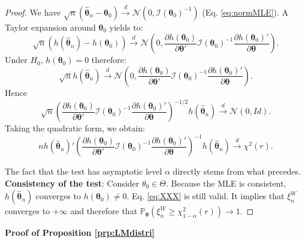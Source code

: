 \documentclass[
  12pt,
]{book}
\theoremstyle{definition}
\theoremstyle{definition}
\theoremstyle{definition}
\theoremstyle{definition}
\theoremstyle{remark}
\begin{document}
\begin{proof}
We have \(\sqrt{n}(\hat{\boldsymbol\theta}_{n} - \boldsymbol\theta_{0}) \overset{d}{\rightarrow} \mathcal{N}(0,\mathcal{I}(\boldsymbol\theta_0)^{-1})\) (Eq. \eqref{eq:normMLE}). A Taylor expansion around \(\boldsymbol\theta_0\) yields to:
\begin{equation}
\sqrt{n}(h(\hat{\boldsymbol\theta}_{n}) - h(\boldsymbol\theta_{0})) \overset{d}{\rightarrow} \mathcal{N}\left(0,\frac{\partial h(\boldsymbol\theta_{0})}{\partial \boldsymbol\theta'}\mathcal{I}(\boldsymbol\theta_0)^{-1}\frac{\partial h(\boldsymbol\theta_{0})'}{\partial \boldsymbol\theta}\right). \label{eq:XXX}
\end{equation}
Under \(H_0\), \(h(\boldsymbol\theta_{0})=0\) therefore:
\begin{equation}
\sqrt{n} h(\hat{\boldsymbol\theta}_{n}) \overset{d}{\rightarrow} \mathcal{N}\left(0,\frac{\partial h(\boldsymbol\theta_{0})}{\partial \boldsymbol\theta'}\mathcal{I}(\boldsymbol\theta_0)^{-1}\frac{\partial h(\boldsymbol\theta_{0})'}{\partial \boldsymbol\theta}\right). \label{eq:lm10}
\end{equation}
Hence
\[
\sqrt{n} \left(
\frac{\partial h(\boldsymbol\theta_{0})}{\partial \boldsymbol\theta'}\mathcal{I}(\boldsymbol\theta_0)^{-1}\frac{\partial h(\boldsymbol\theta_{0})'}{\partial \boldsymbol\theta}
\right)^{-1/2} h(\hat{\boldsymbol\theta}_{n}) \overset{d}{\rightarrow} \mathcal{N}\left(0,Id\right).
\]
Taking the quadratic form, we obtain:
\[
n h(\hat{\boldsymbol\theta}_{n})'  \left(
\frac{\partial h(\boldsymbol\theta_{0})}{\partial \boldsymbol\theta'}\mathcal{I}(\boldsymbol\theta_0)^{-1}\frac{\partial h(\boldsymbol\theta_{0})'}{\partial \boldsymbol\theta}
\right)^{-1} h(\hat{\boldsymbol\theta}_{n}) \overset{d}{\rightarrow} \chi^2(r).
\]

The fact that the test has asymptotic level \(\alpha\) directly stems from what precedes. \textbf{Consistency of the test}: Consider \(\theta_0 \in \Theta\). Because the MLE is consistent, \(h(\hat{\boldsymbol\theta}_{n})\) converges to \(h(\boldsymbol\theta_0) \ne 0\). Eq. \eqref{eq:XXX} is still valid. It implies that \(\xi^W_n\) converges to \(+\infty\) and therefore that \(\mathbb{P}_{\boldsymbol\theta}(\xi^W_n \ge \chi^2_{1-\alpha}(r)) \rightarrow 1\).
\end{proof}

\textbf{Proof of Proposition \ref{prp:LMdistri}}
\end{document}
